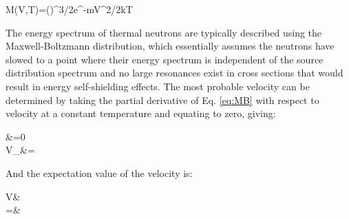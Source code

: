 \beq
\label{eq:MB}
M(V,T)=\left(\right)^{3/2}e^{-mV^2/2kT}
\eeq

The energy spectrum of thermal neutrons are typically described using the Maxwell-Boltzmann distribution, which essentially assumes the neutrons have slowed to a point where their energy spectrum is independent of the source distribution spectrum and no large resonances exist in cross sections that would result in energy self-shielding effects. The most probable velocity can be determined by taking the partial derivative of Eq. \eqref{eq:MB} with respect to velocity at a constant temperature and equating to zero, giving:

\beqa
{}&=0\\
V_{}&=
\eeqa

And the expectation value of the velocity is:

\beqa
\langle V\rangle\equiv&\\
=&
\eeqa
